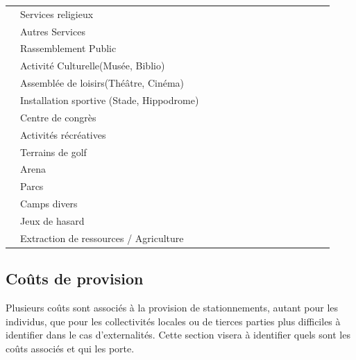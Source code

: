 \begin{landscape}
\begin{center}
\begin{longtable}{m{0.5cm} | p{2.5cm}  *{13}{|m{1.2cm}}|}
        & Services religieux \\
        & Autres Services \\\hline
         & Rassemblement Public \\
        & Activité Culturelle(Musée, Biblio)  \\
        & Assemblée de loisirs(Théâtre, Cinéma) \\
        & Installation sportive (Stade, Hippodrome) \\
        & Centre de congrès  \\
        & Activités récréatives \\
        & Terrains de golf\\
        & Arena\\
        & Parcs \\
        & Camps divers  \\
        & Jeux de hasard \\\hline
       & Extraction de ressources / Agriculture & \\
      
    \end{longtable}
    \end{center}
  \end{landscape}
  \normalsize
  \FloatBarrier

  

  
  \subsection{Coûts de provision}
    Plusieurs coûts sont associés à la provision de stationnements, autant pour les individus, que pour les collectivités locales ou de tierces parties plus difficiles à identifier dans le cas d'externalités. Cette section visera à identifier quels sont les coûts associés et qui les porte.

